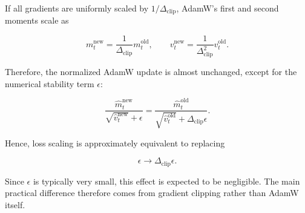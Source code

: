 \documentclass{article} %
\begin{document}
If all gradients are uniformly scaled by $1/\Delta_{\mathrm{clip}}$, AdamW's first and second moments scale as

\begin{equation}
m_t^{\mathrm{new}}
=
\frac{1}{\Delta_{\mathrm{clip}}}m_t^{\mathrm{old}},
\qquad
v_t^{\mathrm{new}}
=
\frac{1}{\Delta_{\mathrm{clip}}^2}v_t^{\mathrm{old}}.
\end{equation}

Therefore, the normalized AdamW update is almost unchanged, except for the numerical stability term $\epsilon$:

\begin{equation}
\frac{\hat m_t^{\mathrm{new}}}
{\sqrt{\hat v_t^{\mathrm{new}}}+\epsilon}
=
\frac{\hat m_t^{\mathrm{old}}}
{\sqrt{\hat v_t^{\mathrm{old}}}
+
\Delta_{\mathrm{clip}}\epsilon}.
\end{equation}

Hence, loss scaling is approximately equivalent to replacing

\begin{equation}
\epsilon
\rightarrow
\Delta_{\mathrm{clip}}\epsilon.
\end{equation}

Since $\epsilon$ is typically very small, this effect is expected to be negligible. The main practical difference therefore comes from gradient clipping rather than AdamW itself.
\end{document}
